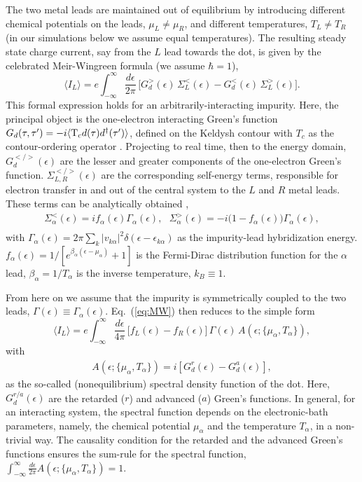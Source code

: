 \documentclass[aps,pra,twocolumn,groupedaddress,showpacs,superscriptaddress,amssymb,amsmath]{revtex4-1}
\newcommand{\be}{\begin{equation}}
\newcommand{\ee}{\end{equation}}
\newcommand{\bea}{\begin{eqnarray}}
\newcommand{\eea}{\end{eqnarray}}
\begin{document}
The two metal leads are maintained out of equilibrium by introducing different chemical potentials on the leads, 
$\mu_L\neq \mu_R$, and different temperatures, $T_L\neq T_R$ (in our simulations below we assume equal temperatures).
The resulting steady state charge current, say from the $L$ lead towards the dot, 
is given by the celebrated Meir-Wingreen formula  \cite{meir-wingreen,Haug-book} (we assume $\hbar=1$),
%
\be
\langle I_L \rangle = e \int_{-\infty}^{\infty} \frac{d\epsilon}{2 \pi} \, 
\big[G_d^{>}(\epsilon) \,\Sigma_L^{<}(\epsilon) - G_d^{<}(\epsilon) \, \Sigma_L^{>}(\epsilon) \big].
\label{eq:MW}
\ee 
%
This formal expression holds for an arbitrarily-interacting impurity. 
Here, the principal object is the one-electron interacting Green's function
$G_d(\tau, \tau')=-i\langle {\rm T_c}d(\tau)d^{\dagger}(\tau') \rangle$, defined
on the Keldysh contour  with $T_c$ as the contour-ordering operator
\cite{Haug-book, Rammer_review, Rammer_book}.
%
Projecting to real time, then to the energy  domain,
$G_{d}^{</>}(\epsilon)$ are the lesser and greater components of the one-electron Green's function.
$\Sigma_{L,R}^{</>}(\epsilon)$ are the corresponding self-energy terms, 
responsible for electron transfer in and out of the central system to the $L$ and $R$ metal leads.
These terms can be analytically obtained \cite{Haug-book, Rammer_review, Rammer_book},
%
\bea
\Sigma_{\alpha}^{<}(\epsilon) = i f_{\alpha}(\epsilon) \Gamma_{\alpha}(\epsilon),  \,\,\,\,
\Sigma_{\alpha}^{>}(\epsilon) = -i \big(1- f_{\alpha}(\epsilon)\big) \Gamma_{\alpha}(\epsilon),
\nonumber\\
\eea
%
with $\Gamma_{\alpha}(\epsilon)= 2 \pi \sum_{k} |v_{k\alpha }|^2 \delta (\epsilon-\epsilon_{k\alpha})$ as the impurity-lead
hybridization energy.
$f_{\alpha}(\epsilon)=1/[e^{\beta_{\alpha} (\epsilon-\mu_{\alpha})}+1]$ is the Fermi-Dirac 
distribution function for the $\alpha$ lead, $\beta_{\alpha}=1/T_{\alpha}$ is the inverse temperature, $k_B\equiv 1$.

From here on we assume that the impurity is symmetrically coupled to the two leads, 
$\Gamma(\epsilon)\equiv \Gamma_{\alpha}(\epsilon)$. 
Eq.~(\ref{eq:MW}) then reduces to the simple form
%
\be
\langle I_L \rangle  = e \int_{-\infty}^{\infty} \frac{d\epsilon}{4 \pi } \, \big[f_L(\epsilon)-f_R(\epsilon)\big] \,\Gamma(\epsilon) \,A(\epsilon; \{\mu_{\alpha},T_{\alpha}\}),
\label{eq:Lan-cur}
\ee
%
with
%
\bea
A(\epsilon; \{\mu_{\alpha},T_{\alpha}\}) = i \left[G_d^r(\epsilon)-G_d^a(\epsilon)\right],
\eea
%
as the so-called (nonequilibrium) spectral density function of the dot. 
Here, $G^{r/a}_d(\epsilon)$ are the retarded ($r$) and advanced ($a$) Green's functions. 
In general, for an interacting system, the spectral function depends on the electronic-bath parameters,
namely, the chemical potential $\mu_{\alpha}$ and the temperature $T_{\alpha}$, in a non-trivial way. 
%
The causality condition for the retarded and the advanced  Green's functions ensures the 
sum-rule for the spectral function, 
$\int _{-\infty}^{\infty} \frac{d\epsilon}{2\pi}  A(\epsilon; \{\mu_{\alpha},T_{\alpha}\})=1$.
\end{document}
